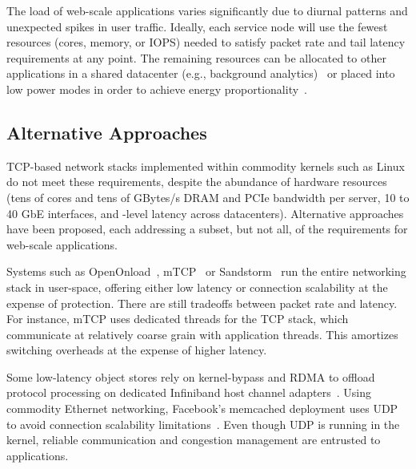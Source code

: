  The load of web-scale applications
varies significantly due to diurnal patterns and unexpected spikes in
user traffic. Ideally, each service node will use the fewest
resources (cores, memory, or IOPS) needed to satisfy packet rate
and tail latency requirements at any point. The remaining
resources can be allocated to other applications in a shared
datacenter (e.g., background
analytics)~\cite{DBLP:conf/asplos/DelimitrouK14,Hindman:2011:MPF,DBLP:conf/eurosys/LeverichK14}
or placed into low power modes in order to achieve energy
proportionality~\cite{DBLP:journals/computer/BarrosoH07, DBLP:conf/isca/LoCGBK14}.


\subsection{Alternative Approaches}
\label{sec:motivation:current}

TCP-based network stacks implemented within commodity kernels such as
Linux do not meet these requirements, despite the abundance of hardware
resources (tens of cores and tens of GBytes/s DRAM and PCIe
bandwidth per server, 10 to 40 GbE interfaces, and \microsecond-level
latency across datacenters).
Alternative approaches have been proposed, each addressing a subset,
but not all, of
the requirements for web-scale applications.


 Systems such as
OpenOnload~\cite{openonload}, mTCP~\cite{jeong2014mtcp} or
Sandstorm~\cite{sandstorm} run the entire networking stack in
user-space, offering either low latency or connection scalability at
the expense of protection. There are still tradeoffs between packet
rate and latency. For instance, mTCP uses dedicated threads for the
TCP stack, which communicate at relatively coarse grain with
application threads. This amortizes switching overheads at the expense
of higher latency.

 Some low-latency object stores rely on
kernel-bypass and RDMA to offload protocol processing on dedicated
Infiniband host channel
adapters~\cite{dragojevic14farm,DBLP:conf/icpp/JoseSLZHWIOWSP11,mitchell:rdma,DBLP:conf/sosp/OngaroRSOR11}.
Using commodity Ethernet networking, Facebook's memcached deployment
uses UDP to avoid connection scalability
limitations~\cite{DBLP:conf/nsdi/NishtalaFGKLLMPPSSTV13}. Even though UDP is running in
the kernel, reliable communication and congestion management are
entrusted to applications.

